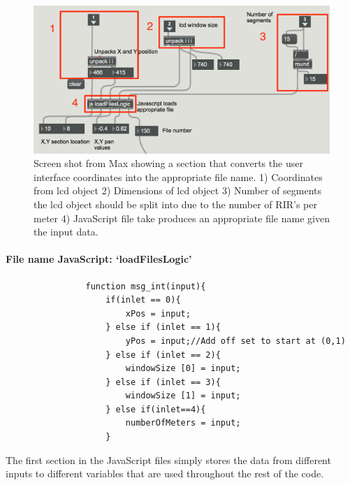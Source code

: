 \documentclass[../../main.tex]{subfiles}
\begin{document}
			\begin{figure}[H]
				\centerline{\includegraphics[scale = 0.6]{Sections/Implementation/Max/images/Max/UI_to_file_edit_3.png}}
				\caption{Screen shot from Max showing a section that converts the user interface coordinates into the appropriate file name. 1) Coordinates from lcd object 2) Dimensions of lcd object 3) Number of segments the lcd object should be split into due to the number of \ac{RIR}'s per meter 4) JavaScript file take produces an appropriate file name given the input data.}
				\label{locationsConvert}
			\end{figure}

			\paragraph{File name JavaScript: `loadFilesLogic'}

			\begin{minipage}{0.6\textwidth}
				\begin{lstlisting}
				function msg_int(input){
					if(inlet == 0){
						xPos = input; 
					} else if (inlet == 1){
						yPos = input;//Add off set to start at (0,1)
					} else if (inlet == 2){
						windowSize [0] = input;
					} else if (inlet == 3){
						windowSize [1] = input;
					} else if(inlet==4){
						numberOfMeters = input;
					}
				\end{lstlisting}
				\end{minipage}
				\begin{minipage}{0.35\textwidth}
				The first section in the JavaScript files simply stores the data from different inputs to different variables that are used throughout the rest of the code.
				\end{minipage}
\end{document}
